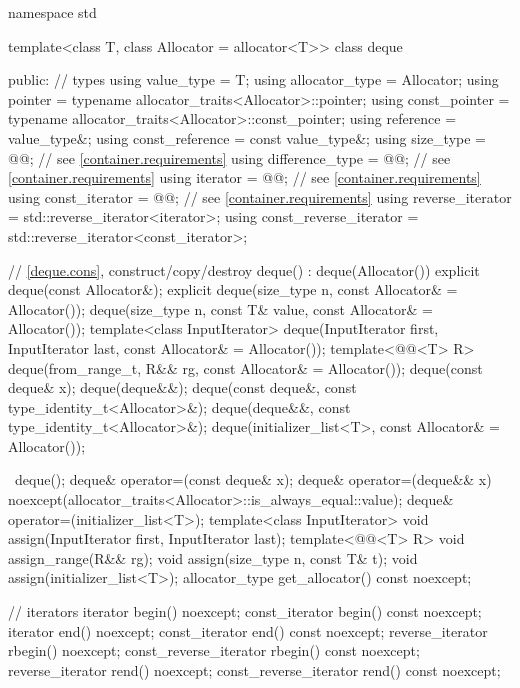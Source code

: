 \begin{codeblock}
namespace std {
  template<class T, class Allocator = allocator<T>>
  class deque {
  public:
    // types
    using value_type             = T;
    using allocator_type         = Allocator;
    using pointer                = typename allocator_traits<Allocator>::pointer;
    using const_pointer          = typename allocator_traits<Allocator>::const_pointer;
    using reference              = value_type&;
    using const_reference        = const value_type&;
    using size_type              = @@; // see \ref{container.requirements}
    using difference_type        = @@; // see \ref{container.requirements}
    using iterator               = @@; // see \ref{container.requirements}
    using const_iterator         = @@; // see \ref{container.requirements}
    using reverse_iterator       = std::reverse_iterator<iterator>;
    using const_reverse_iterator = std::reverse_iterator<const_iterator>;

    // \ref{deque.cons}, construct/copy/destroy
    deque() : deque(Allocator()) { }
    explicit deque(const Allocator&);
    explicit deque(size_type n, const Allocator& = Allocator());
    deque(size_type n, const T& value, const Allocator& = Allocator());
    template<class InputIterator>
      deque(InputIterator first, InputIterator last, const Allocator& = Allocator());
    template<@@<T> R>
      deque(from_range_t, R&& rg, const Allocator& = Allocator());
    deque(const deque& x);
    deque(deque&&);
    deque(const deque&, const type_identity_t<Allocator>&);
    deque(deque&&, const type_identity_t<Allocator>&);
    deque(initializer_list<T>, const Allocator& = Allocator());

    ~deque();
    deque& operator=(const deque& x);
    deque& operator=(deque&& x)
      noexcept(allocator_traits<Allocator>::is_always_equal::value);
    deque& operator=(initializer_list<T>);
    template<class InputIterator>
      void assign(InputIterator first, InputIterator last);
    template<@@<T> R>
      void assign_range(R&& rg);
    void assign(size_type n, const T& t);
    void assign(initializer_list<T>);
    allocator_type get_allocator() const noexcept;

    // iterators
    iterator               begin() noexcept;
    const_iterator         begin() const noexcept;
    iterator               end() noexcept;
    const_iterator         end() const noexcept;
    reverse_iterator       rbegin() noexcept;
    const_reverse_iterator rbegin() const noexcept;
    reverse_iterator       rend() noexcept;
    const_reverse_iterator rend() const noexcept;

}}
\end{codeblock}
